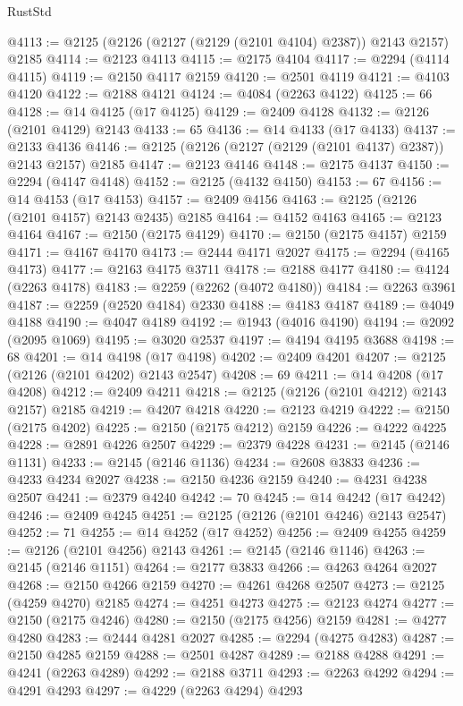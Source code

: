 \begin{lexlean}{RustStd}
\begin{coremodule}
@4113 := @2125 (@2126 (@2127 (@2129 (@2101 @4104) @2387)) @2143 @2157) @2185
@4114 := @2123 @4113
@4115 := @2175 @4104
@4117 := @2294 (@4114 @4115)
@4119 := @2150 @4117 @2159
@4120 := @2501 @4119
@4121 := @4103 @4120
@4122 := @2188 @4121
@4124 := @4084 (@2263 @4122)
@4125 := 66
@4128 := @14 @4125 (@17 @4125)
@4129 := @2409 @4128
@4132 := @2126 (@2101 @4129) @2143
@4133 := 65
@4136 := @14 @4133 (@17 @4133)
@4137 := @2133 @4136
@4146 := @2125 (@2126 (@2127 (@2129 (@2101 @4137) @2387)) @2143 @2157) @2185
@4147 := @2123 @4146
@4148 := @2175 @4137
@4150 := @2294 (@4147 @4148)
@4152 := @2125 (@4132 @4150)
@4153 := 67
@4156 := @14 @4153 (@17 @4153)
@4157 := @2409 @4156
@4163 := @2125 (@2126 (@2101 @4157) @2143 @2435) @2185
@4164 := @4152 @4163
@4165 := @2123 @4164
@4167 := @2150 (@2175 @4129)
@4170 := @2150 (@2175 @4157) @2159
@4171 := @4167 @4170
@4173 := @2444 @4171 @2027
@4175 := @2294 (@4165 @4173)
@4177 := @2163 @4175 @3711
@4178 := @2188 @4177
@4180 := @4124 (@2263 @4178)
@4183 := @2259 (@2262 (@4072 @4180))
@4184 := @2263 @3961
@4187 := @2259 (@2520 @4184) @2330
@4188 := @4183 @4187
@4189 := @4049 @4188
@4190 := @4047 @4189
@4192 := @1943 (@4016 @4190)
@4194 := @2092 (@2095 @1069)
@4195 := @3020 @2537
@4197 := @4194 @4195 @3688
@4198 := 68
@4201 := @14 @4198 (@17 @4198)
@4202 := @2409 @4201
@4207 := @2125 (@2126 (@2101 @4202) @2143 @2547)
@4208 := 69
@4211 := @14 @4208 (@17 @4208)
@4212 := @2409 @4211
@4218 := @2125 (@2126 (@2101 @4212) @2143 @2157) @2185
@4219 := @4207 @4218
@4220 := @2123 @4219
@4222 := @2150 (@2175 @4202)
@4225 := @2150 (@2175 @4212) @2159
@4226 := @4222 @4225
@4228 := @2891 @4226 @2507
@4229 := @2379 @4228
@4231 := @2145 (@2146 @1131)
@4233 := @2145 (@2146 @1136)
@4234 := @2608 @3833
@4236 := @4233 @4234 @2027
@4238 := @2150 @4236 @2159
@4240 := @4231 @4238 @2507
@4241 := @2379 @4240
@4242 := 70
@4245 := @14 @4242 (@17 @4242)
@4246 := @2409 @4245
@4251 := @2125 (@2126 (@2101 @4246) @2143 @2547)
@4252 := 71
@4255 := @14 @4252 (@17 @4252)
@4256 := @2409 @4255
@4259 := @2126 (@2101 @4256) @2143
@4261 := @2145 (@2146 @1146)
@4263 := @2145 (@2146 @1151)
@4264 := @2177 @3833
@4266 := @4263 @4264 @2027
@4268 := @2150 @4266 @2159
@4270 := @4261 @4268 @2507
@4273 := @2125 (@4259 @4270) @2185
@4274 := @4251 @4273
@4275 := @2123 @4274
@4277 := @2150 (@2175 @4246)
@4280 := @2150 (@2175 @4256) @2159
@4281 := @4277 @4280
@4283 := @2444 @4281 @2027
@4285 := @2294 (@4275 @4283)
@4287 := @2150 @4285 @2159
@4288 := @2501 @4287
@4289 := @2188 @4288
@4291 := @4241 (@2263 @4289)
@4292 := @2188 @3711
@4293 := @2263 @4292
@4294 := @4291 @4293
@4297 := @4229 (@2263 @4294) @4293

\end{coremodule}
\end{lexlean}
